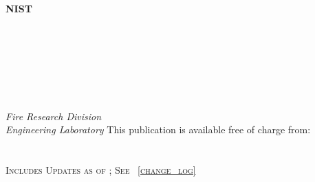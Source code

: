 \begin{titlepage}
\begin{flushright}
\LARGE{{\textbf{NIST \pubseries}}}\\
\LARGE{{\textbf{\pubnumber}}}\\
\vfill
\Huge{{\textbf{\pubtitle}}}\\
\Large{{\textit{\pubsubtitle}}}\\
\vfill
\normalsize
\authorone\\
\authortwo\\
\authorthree\\
\authorfour\\
\textit{Fire Research Division}\\
\textit{Engineering Laboratory}
\vfill
\normalsize This publication is available free of charge from:\\
\DOI\\
\vfill
\normalsize \pubmonth~\pubyear\\
\textsc{Includes Updates as of \erratadate; See \appendixname~\ref{change_log}} %
\vfill


\end{flushright}
\end{titlepage}
